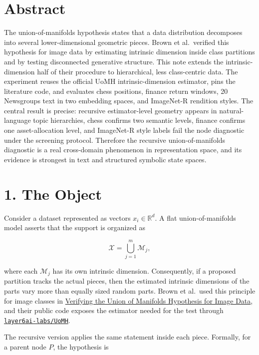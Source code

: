 \documentclass[11pt]{article}
\begin{document}
\section{Abstract}\label{abstract}

The union-of-manifolds hypothesis states that a data distribution decomposes into several lower-dimensional geometric pieces. Brown et al.~verified this hypothesis for image data by estimating intrinsic dimension inside class partitions and by testing disconnected generative structure. This note extends the intrinsic-dimension half of their procedure to hierarchical, less class-centric data. The experiment reuses the official UoMH intrinsic-dimension estimator, pins the literature code, and evaluates chess positions, finance return windows, 20 Newsgroups text in two embedding spaces, and ImageNet-R rendition styles. The central result is precise: recursive estimator-level geometry appears in natural-language topic hierarchies, chess confirms two semantic levels, finance confirms one asset-allocation level, and ImageNet-R style labels fail the node diagnostic under the screening protocol. Therefore the recursive union-of-manifolds diagnostic is a real cross-domain phenomenon in representation space, and its evidence is strongest in text and structured symbolic state spaces.

\section{1. The Object}\label{the-object}

Consider a dataset represented as vectors \(x_i \in \mathbb{R}^d\). A flat union-of-manifolds model asserts that the support is organized as

\[
\mathcal{X} = \bigcup_{j=1}^{m} \mathcal{M}_j,
\]

where each \(\mathcal{M}_j\) has its own intrinsic dimension. Consequently, if a proposed partition tracks the actual pieces, then the estimated intrinsic dimensions of the parts vary more than equally sized random parts. Brown et al.~used this principle for image classes in \href{https://arxiv.org/abs/2207.02862}{Verifying the Union of Manifolds Hypothesis for Image Data}, and their public code exposes the estimator needed for the test through \href{https://github.com/layer6ai-labs/UoMH}{\texttt{layer6ai-labs/UoMH}}.

The recursive version applies the same statement inside each piece. Formally, for a parent node \(P\), the hypothesis is
\end{document}
